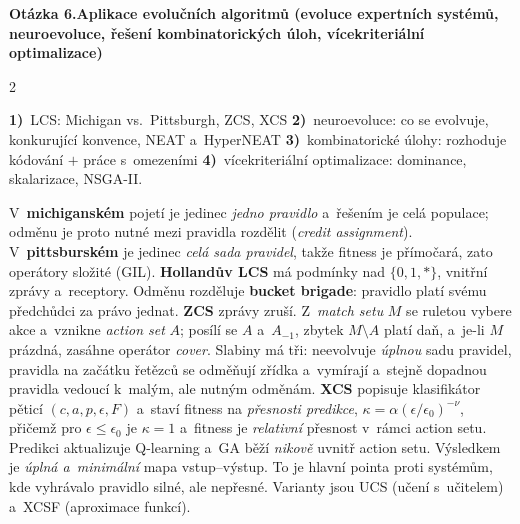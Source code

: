 \documentclass[10pt,a4paper]{article}
\newcommand{\qpage}[2]{%
  \begin{qbox}{}
  \textbf{\large Otázka #1.}\quad\textbf{#2}
  \end{qbox}
  \vspace{-0.3em}}
\newcommand{\hh}[1]{\par\smallskip\noindent{\bfseries\color{headcol}#1}\par\nobreak\vspace{-0.2em}}
\newcommand{\ok}[1]{{\bfseries\color{markcol}#1)}\,}   %
\newcommand{\tm}[1]{\textbf{#1}}
\newcommand{\en}[1]{\emph{#1}}
\begin{document}
\qpage{6}{Aplikace evolučních algoritmů (evoluce expertních systémů, neuroevoluce,
řešení kombinatorických úloh, vícekriteriální optimalizace)}
\begin{multicols}{2}
\footnotesize

\hh{Osnova odpovědi}
\ok{1} LCS: Michigan vs.\ Pittsburgh, ZCS, XCS \ok{2} neuroevoluce: co se evolvuje, konkurující
konvence, NEAT a~HyperNEAT \ok{3} kombinatorické úlohy: rozhoduje kódování $+$ práce s~omezeními
\ok{4} vícekriteriální optimalizace: dominance, skalarizace, NSGA-II.

\hh{LCS: dva přístupy}
V~\tm{michiganském} pojetí je jedinec \emph{jedno pravidlo} a~řešením je celá populace; odměnu je
proto nutné mezi pravidla rozdělit (\en{credit assignment}). V~\tm{pittsburském} je jedinec
\emph{celá sada pravidel}, takže fitness je přímočará, zato operátory složité (GIL).
\tm{Hollandův LCS} má podmínky nad $\{0,1,*\}$, vnitřní zprávy a~receptory. Odměnu rozděluje
\tm{bucket brigade}: pravidlo platí svému předchůdci za právo jednat.
\tm{ZCS} zprávy zruší. Z~\en{match setu} $M$ se ruletou vybere akce a~vznikne \en{action set}
$A$; posílí se $A$ a~$A_{-1}$, zbytek $M\setminus A$ platí daň, a~je-li $M$ prázdná, zasáhne
operátor \en{cover}. Slabiny má tři: neevolvuje \emph{úplnou} sadu pravidel, pravidla na začátku
řetězců se odměňují zřídka a~vymírají a~stejně dopadnou pravidla vedoucí k~malým, ale nutným
odměnám.
\tm{XCS} popisuje klasifikátor pěticí $(c,a,p,\epsilon,F)$ a~staví fitness na \emph{přesnosti
predikce}, $\kappa=\alpha(\epsilon/\epsilon_0)^{-\nu}$, přičemž pro $\epsilon\le\epsilon_0$ je
$\kappa=1$ a~fitness je \emph{relativní} přesnost v~rámci action setu. Predikci aktualizuje
Q-learning a~GA běží \emph{nikově} uvnitř action setu.
Výsledkem je \emph{úplná a~minimální} mapa vstup--výstup. To je hlavní pointa proti
 systémům, kde vyhrávalo pravidlo silné, ale nepřesné. Varianty jsou UCS
(učení s~učitelem) a~XCSF (aproximace funkcí).


\end{multicols}
\end{document}
